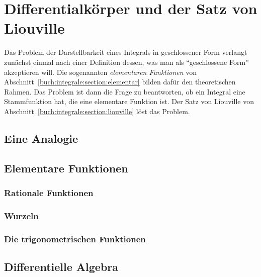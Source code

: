 %
%
%
\section{Differentialkörper und der Satz von Liouville
\label{buch:integrale:section:dkoerper}}
Das Problem der Darstellbarkeit eines Integrals in geschlossener
Form verlangt zunächst einmal nach einer Definition dessen, was man
als ``geschlossene Form'' akzeptieren will.
Die sogenannten {\em elementaren Funktionen} von
Abschnitt~\ref{buch:integrale:section:elementar}
bilden dafür den theoretischen Rahmen.
Das Problem ist dann die Frage zu beantworten, ob ein Integral eine
Stammfunktion hat, die eine elementare Funktion ist.
Der Satz von Liouville von Abschnitt~\ref{buch:integrale:section:liouville}
löst das Problem.

\subsection{Eine Analogie
\label{buch:integrale:section:analogie}}

\subsection{Elementare Funktionen
\label{buch:integrale:section:elementar}}


\subsubsection{Rationale Funktionen}

\subsubsection{Wurzeln}

\subsubsection{Die trigonometrischen Funktionen}

\subsection{Differentielle Algebra
\label{buch:integrale:section:dalgebra}}

